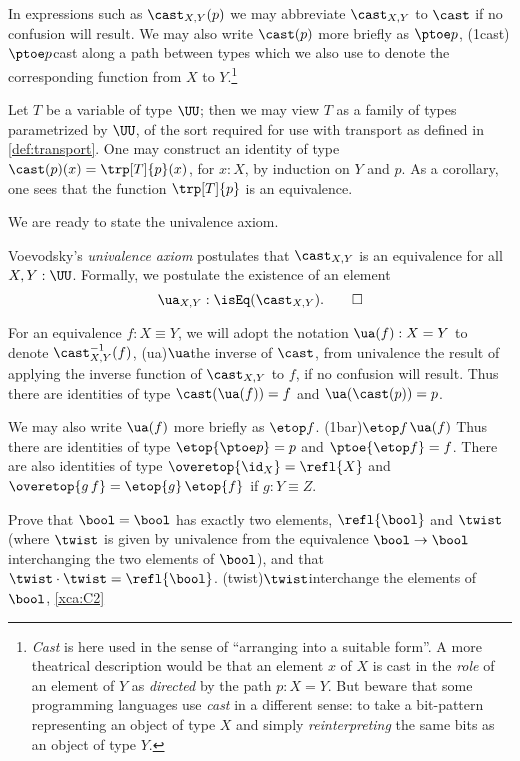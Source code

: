 In expressions such as $\cast_{X,Y}(p)$ we may abbreviate $\cast_{X,Y}$ to $\cast$ if
no confusion will result. We may also write $\cast (p)$ more briefly as $\ptoe p$,%
\glossary(1cast){$\protect\ptoe p$}{cast along a path between types}
which we also use to denote the corresponding function from $X$ to $Y$.\footnote{%
    \emph{Cast} is here used in the sense of ``arranging into a suitable form''.
    A more theatrical description would be that an element $x$ of $X$ is cast in the \emph{role} of an element of $Y$
    as \emph{directed} by the path $p : X = Y$.
    But beware that some programming languages use \emph{cast} in a different sense:
    to take a bit-pattern representing an object of type $X$ and simply \emph{reinterpreting} the same bits as an object of type $Y$.}

Let $T$ be a variable of type $\UU$; then we may view $T$ as a family of types parametrized by $\UU$, of the sort required for use with
transport as defined in \cref{def:transport}.  One may construct an identity of type $\cast(p)(x) = \trp[T]{p} (x)$, for $x : X$, by induction
on $Y$ and $p$.  As a corollary, one sees that the function $\trp[T]{p}$ is an equivalence.

We are ready to state the univalence axiom.

\begin{principle}\label{def:univalence}
    Voevodsky's \emph{univalence axiom} postulates that $\cast_{X,Y}$ is an equivalence for all $X,Y:\UU$.
    Formally, we postulate the existence of an element
    \[
      \ua_{X,Y} : \isEq(\cast_{X,Y}).\qedhere
    \]
\end{principle}

For an equivalence $f: X\equiv Y$, we will adopt the notation $\ua(f) : X = Y $ to denote $\cast_{X,Y}^{-1}(f)$,%
\glossary(ua){$\protect\ua$}{the inverse of $\protect\cast$, from univalence}
the result of applying the
inverse function of $\cast_{X,Y}$ to $f$, if no confusion will result.  Thus there are identities of type $\cast (\ua (f)) = f$ and $\ua (\cast (p)) = p$.

We may also write $\ua (f)$ more briefly as $\etop f$.%
\glossary(1bar){$\protect\etop f$}{$\protect\ua(f)$}
Thus there are identities of type $\etop {\ptoe p} = p$ and $\ptoe {\etop f} = f$.  There are also identities of type $\overetop{\id_X}=\refl{X}$
and $\overetop{g\,f}=\etop{g}\,\etop{f}$ if $g: Y\equiv Z$.

\begin{xca}\label{xca:C2}
Prove that $\bool=\bool$ has exactly two elements,
$\refl{\bool}$ and $\twist$ (where $\twist$ is given by
univalence from the equivalence $\bool\to\bool$ interchanging
the two elements of $\bool$), and that $\twist\cdot\twist=\refl{\bool}$.%
\glossary(twist){$\protect\twist$}{interchange the elements of $\bool$,
  \cref{xca:C2}}
\end{xca}


